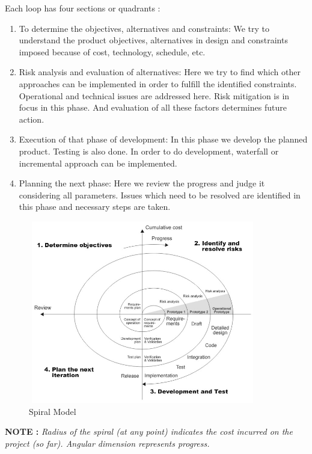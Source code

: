 \documentclass{article}
\begin{document}
Each loop has four sections or quadrants :\\
\begin{enumerate}
    

\item To determine the objectives, alternatives and constraints: We try to understand the product objectives, alternatives in design and constraints imposed because of cost, technology, schedule, etc.

\item  Risk analysis and evaluation of alternatives: Here we try to find which other approaches can be implemented in order to fulfill the identified constraints. Operational and technical issues are addressed here. Risk mitigation is in focus in this phase. And evaluation of all these factors determines future action.

\item  Execution of that phase of development: In this phase we develop the planned product. Testing is also done. In order to do development, waterfall or incremental approach can be implemented.

\item  Planning the next phase: Here we review the progress and judge it considering all parameters. Issues which need to be resolved are identified in this phase and necessary steps are taken.
\end{enumerate}
 \begin{figure}
  \includegraphics[width=10cm, height=8cm]{fig4.jpg}
  \caption{Spiral Model }
  
\end{figure}
 
\textbf{NOTE :}
\textit{
Radius of the spiral (at any point) indicates the cost incurred on the project (so far). Angular dimension represents progress.}
\end{document}
